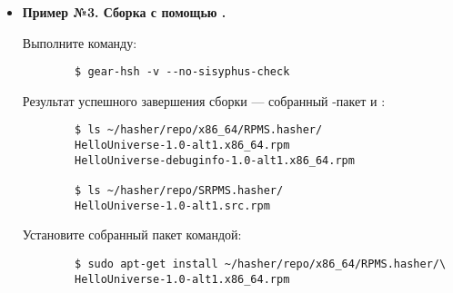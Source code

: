 \begin{itemize}
	\item \textbf{Пример №3. Сборка с помощью .}
	
	Выполните команду: 
	\begin{verbatim}
		$ gear-hsh -v --no-sisyphus-check 
	\end{verbatim}
	
	Результат успешного завершения сборки --- собранный -пакет и :
	\begin{verbatim}
		$ ls ~/hasher/repo/x86_64/RPMS.hasher/
		HelloUniverse-1.0-alt1.x86_64.rpm
		HelloUniverse-debuginfo-1.0-alt1.x86_64.rpm
		
		$ ls ~/hasher/repo/SRPMS.hasher/
		HelloUniverse-1.0-alt1.src.rpm
	\end{verbatim} 
	
	Установите собранный пакет командой: 
	\begin{verbatim}
		$ sudo apt-get install ~/hasher/repo/x86_64/RPMS.hasher/\
		HelloUniverse-1.0-alt1.x86_64.rpm
	\end{verbatim}
\end{itemize} 